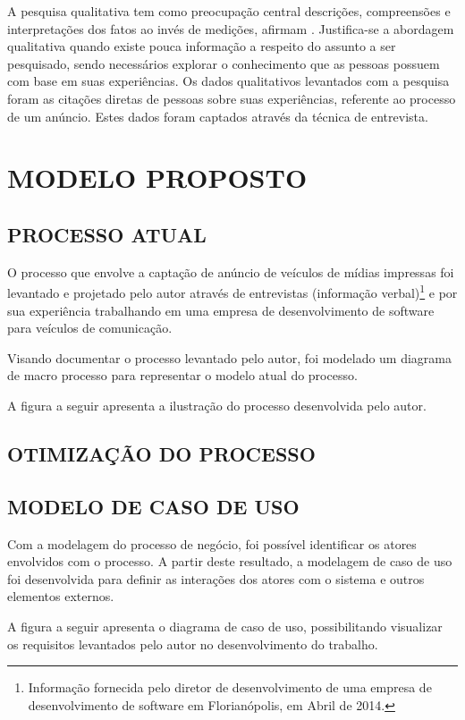 \documentclass[
	12pt,				%
	openright,			%
	oneside,			%
	a4paper,			%
	chapter=TITLE,		%
	section=TITLE,		%
	english,			%
	french,				%
	spanish,			%
	brazil				%
	]{abntex2}
\begin{document}
A pesquisa qualitativa tem como preocupação central descrições, compreensões e interpretações dos fatos ao invés de medições, afirmam . Justifica-se a abordagem qualitativa quando existe pouca informação a respeito do assunto a ser pesquisado, sendo necessários explorar o conhecimento que as pessoas possuem com base em suas experiências. Os dados qualitativos levantados com a pesquisa foram as citações diretas de pessoas sobre suas experiências, referente ao processo de um anúncio. Estes dados foram captados através da técnica de entrevista.


\chapter{MODELO PROPOSTO}

\section{PROCESSO ATUAL}
O processo que envolve a captação de anúncio de veículos de mídias impressas foi levantado e projetado pelo autor através de entrevistas (informação verbal)\footnote{Informação fornecida pelo diretor de desenvolvimento de uma empresa de desenvolvimento de software em Florianópolis, em Abril de 2014.} e por sua experiência trabalhando em uma empresa de desenvolvimento de software para veículos de comunicação.

Visando documentar o processo levantado pelo autor, foi modelado um diagrama de macro processo para representar o modelo atual do processo.

A figura a seguir apresenta a ilustração do processo desenvolvida pelo autor.

\section{OTIMIZAÇÃO DO PROCESSO}


\section{MODELO DE CASO DE USO}
Com a modelagem do processo de negócio, foi possível identificar os atores envolvidos com o processo. A partir deste resultado, a modelagem de caso de uso foi desenvolvida para definir as interações dos atores com o sistema e outros elementos externos.

A figura a seguir apresenta o diagrama de caso de uso, possibilitando visualizar os requisitos levantados pelo autor no desenvolvimento do trabalho.
\end{document}
